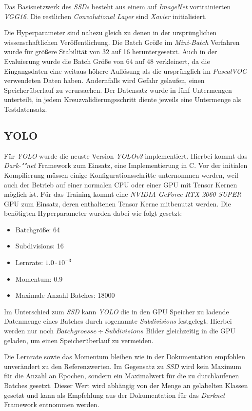 Das Basisnetzwerk des \textit{SSDs} besteht aus einem auf \textit{ImageNet} vortrainierten \textit{VGG16}. Die restlichen \textit{Convolutional Layer} sind \textit{Xavier} initialisiert. 

Die Hyperparameter sind nahezu gleich zu denen in der ursprünglichen wissenschaftlichen Veröffentlichung. Die Batch Größe im \textit{Mini-Batch} Verfahren wurde für größere Stabilität von 32 auf 16 heruntergesetzt. Auch in der Evaluierung wurde die Batch Größe von 64 auf 48 verkleinert, da die Eingangsdaten eine weitaus höhere Auflösung als die ursprünglich im \textit{PascalVOC} verwendeten Daten haben. Andernfalls wird Gefahr gelaufen, einen Speicherüberlauf zu verursachen. Der Datensatz wurde in fünf Untermengen unterteilt, in jedem Kreuzvalidierungsschritt diente jeweils eine Untermenge als Testdatensatz.

\subsection*{YOLO}

Für \textit{YOLO} wurde die neuste Version \textit{YOLOv3} implementiert. Hierbei kommt das \textit{Dark-""net} Framework zum Einsatz, eine Implementierung in C. Vor der initialen Kompilierung müssen einige Konfigurationsschritte unternommen werden, weil auch der Betrieb auf einer normalen CPU oder einer GPU mit Tensor Kernen möglich ist. Für das Training kommt eine \textit{NVIDIA GeForce RTX 2060 SUPER} GPU zum Einsatz, deren enthaltenen Tensor Kerne mitbenutzt werden. Die benötigten Hyperparameter wurden dabei wie folgt gesetzt:

\begin{itemize}
	\item Batchgröße: 64
	\item Subdivisions: 16
	\item Lernrate: $1.0\cdot 10^{-3}$
	\item Momentum: 0.9
	\item Maximale Anzahl Batches: 18000
\end{itemize}

Im Unterschied zum \textit{SSD} kann \textit{YOLO} die in den GPU Speicher zu ladende Datenmenge eines Batches durch sogenannte \textit{Subdivisions} festgelegt. Hierbei werden nur noch $Batchgroesse \div Subdivisions$ Bilder gleichzeitig in die GPU geladen, um einen Speicherüberlauf zu vermeiden.

Die Lernrate sowie das Momentum bleiben wie in der Dokumentation empfohlen unverändert zu den Referenzwerten. Im Gegensatz zu \textit{SSD} wird kein Maximum für die Anzahl an Epochen, sondern ein Maximalwert für die zu durchlaufenen Batches gesetzt. Dieser Wert wird abhängig von der Menge an gelabelten Klassen gesetzt und kann als Empfehlung aus der Dokumentation für das \textit{Darknet} Framework entnommen werden. 

